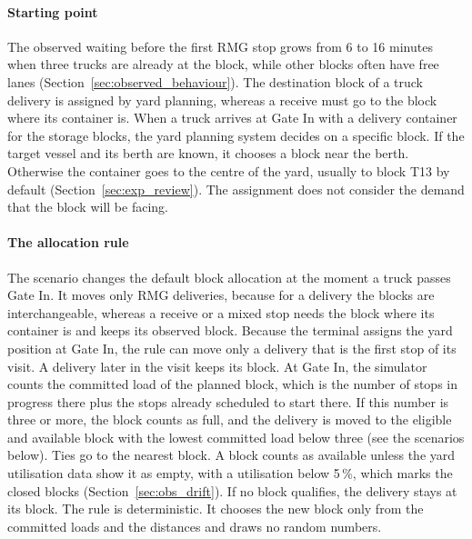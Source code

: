 \paragraph{Starting point}
The observed waiting before the first RMG stop grows from 6 to 16 minutes when
three trucks are already at the block, while other blocks often have free lanes
(Section~\ref{sec:observed_behaviour}). The destination block of a truck delivery
is assigned by yard planning, whereas a receive must go to the block where its
container is. When a truck arrives at Gate In with a delivery container for the
storage blocks, the yard planning system decides on a specific block. If the target
vessel and its berth are known, it chooses a block near the berth. Otherwise the
container goes to the centre of the yard, usually to block T13 by default
(Section~\ref{sec:exp_review}). The assignment does not consider the demand that the
block will be facing.

\paragraph{The allocation rule}
The scenario changes the default block allocation at the moment a truck passes Gate
In. It moves only RMG deliveries, because for a delivery the blocks are
interchangeable, whereas a receive or a mixed stop needs the block where its
container is and keeps its observed block. Because the terminal assigns the yard
position at Gate In, the rule can move only a delivery that is the first stop of its
visit. A delivery later in the visit keeps its block. At Gate In, the simulator
counts the committed load of the planned block, which is the number of stops in
progress there plus the stops already scheduled to start there. If this number is
three or more, the block counts as full, and the delivery is moved to the eligible
and available block with the lowest committed load below three (see the scenarios
below). Ties go to the nearest block. A
block counts as available unless the yard utilisation data show it as empty, with a
utilisation below 5\,\%, which marks the closed blocks
(Section~\ref{sec:obs_drift}). If no block qualifies, the delivery stays at its
block. The rule is deterministic. It chooses the new block only from the committed
loads and the distances and draws no random numbers.

